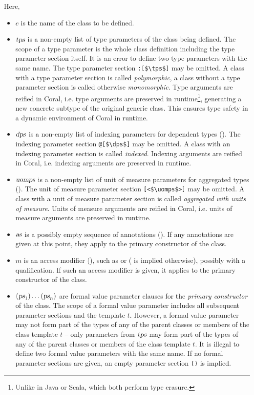 Here, 
\begin{itemize}
\item[]
$c$ is the name of the class to be defined. 

\item[]
$\mbox{\sl tps}$ is a non-empty list of type parameters of the class being defined. The scope of a type parameter is the whole class definition including the type parameter section itself. It is an error to define two type parameters with the same name. The type parameter section \lstinline!:[$\tps$]! may be omitted. A class with a type parameter section is called {\em polymorphic}, a class without a type parameter section is called otherwise {\em monomorphic}. Type arguments are reified in Coral, i.e. type arguments are preserved in runtime\footnote{Unlike in Java or Scala, which both perform type erasure.}, generating a new concrete subtype of the original generic class. This ensures type safety in a dynamic environment of Coral in runtime. 

\item[]
$\mbox{\sl dps}$ is a non-empty list of indexing parameters for dependent types (). The indexing parameter section \lstinline!@[$\dps$]! may be omitted. A class with an indexing parameter section is called {\em indexed}. Indexing arguments are reified in Coral, i.e. indexing arguments are preserved in runtime. 

\item[]
$\mbox{\sl uomps}$ is a non-empty list of unit of measure parameters for aggregated types (). The unit of measure parameter section \lstinline![<$\uomps$>]! may be omitted. A class with a unit of measure parameter section is called {\em aggregated with units of measure}. Units of measure arguments are reified in Coral, i.e. units of measure arguments are preserved in runtime. 

\item[]
$\mbox{\sl as}$ is a possibly empty sequence of annotations (). If any annotations are given at this point, they apply to the primary constructor of the class. 

\item[]
$m$ is an access modifier (), such as  or  ( is implied otherwise), possibly with a qualification. If such an access modifier is given, it applies to the primary constructor of the class. 

\item[]
$(\mbox{\sl ps}_1)\ldots(\mbox{\sl ps}_n)$ are formal value parameter clauses for the {\em primary constructor} of the class. The scope of a formal value parameter includes all subsequent parameter sections and the template $t$. However, a formal value parameter may not form part of the types of any of the parent classes or members of the class template $t$ -- only parameters from $\mbox{\sl tps}$ may form part of the types of any of the parent classes or members of the class template $t$. It is illegal to define two formal value parameters with the same name. If no formal parameter sections are given, an empty parameter section \lstinline!()! is implied. 


\end{itemize}
